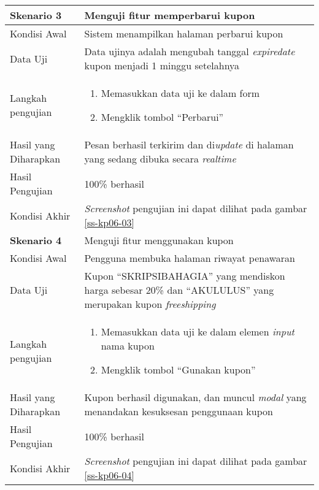 \begin{longtable}{|X|X|}
		
	\textbf{Skenario 3}
		& Menguji fitur memperbarui kupon \\ \hline
	Kondisi Awal
		& Sistem menampilkan halaman perbarui kupon\\ \hline
	Data Uji
		& Data ujinya adalah mengubah tanggal \textit{expiredate} kupon menjadi 1 minggu setelahnya \\ \hline
	Langkah pengujian
		& \begin{enumerate}
		\item Memasukkan data uji ke dalam form
		\item Mengklik tombol ``Perbarui''
	\end{enumerate} \\ \hline
	Hasil yang Diharapkan
		& Pesan berhasil terkirim dan di\textit{update} di halaman yang sedang dibuka secara \textit{realtime} \\ \hline
	Hasil Pengujian
		& 100\% berhasil \\ \hline	
	Kondisi Akhir
		& \textit{Screenshot} pengujian ini dapat dilihat pada gambar \ref{ss-kp06-03}  \\ \hline	
		
		
	\textbf{Skenario 4}
		& Menguji fitur menggunakan kupon \\ \hline
	Kondisi Awal
		& Pengguna membuka halaman riwayat penawaran\\ \hline
	Data Uji
		& Kupon ``SKRIPSIBAHAGIA'' yang mendiskon harga sebesar 20\% dan ``AKULULUS'' yang merupakan kupon \textit{freeshipping}  \\ \hline
	Langkah pengujian
		& \begin{enumerate}
		\item Memasukkan data uji ke dalam elemen \textit{input} nama kupon
		\item Mengklik tombol ``Gunakan kupon''
	\end{enumerate} \\ \hline
	Hasil yang Diharapkan
		& Kupon berhasil digunakan, dan muncul \textit{modal} yang menandakan kesuksesan penggunaan kupon \\ \hline
	Hasil Pengujian
		& 100\% berhasil \\ \hline	
	Kondisi Akhir
		& \textit{Screenshot} pengujian ini dapat dilihat pada gambar \ref{ss-kp06-04}  \\ \hline	

\end{longtable}